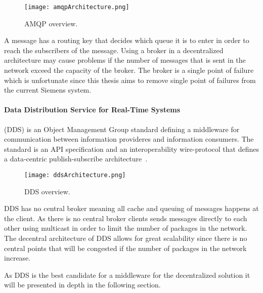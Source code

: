\begin{figure}[!h]
	\centering
	\texttt{[image: amqpArchitecture.png]} 
	\caption[JMS overview]{
		\label{fig:amqpOverview} 
		\footnotesize{%
			AMQP overview.
		}
	}
\end{figure}

A message has a routing key that decides which queue it is to enter in order to reach the subscribers of the message. Using a broker in a decentralized architecture may cause problems if the number of messages that is sent in the network exceed the capacity of the broker.
The broker is a single point of failure which is unfortunate since this thesis aims to remove single point of failures from the current Siemens system.

\paragraph{Data Distribution Service for Real-Time Systems} (DDS) is an Object Management Group standard defining a middleware for communication between information provideres and information consumers.
The standard is an API specification and an interoperability wire-protocol that defines a data-centric publish-subscribe architecture~\cite{pardo2003omg}.

\begin{figure}[!h]
	\centering
	\texttt{[image: ddsArchitecture.png]} 
	\caption[JMS overview]{
		\label{fig:ddsOverview} 
		\footnotesize{%
			DDS overview.
		}
	}
\end{figure}

DDS has no central broker meaning all cache and queuing of messages happens at the client. As there is no central broker clients sends messages directly to each other using multicast in order to limit the number of packages in the network. The decentral architecture of DDS allows for great scalability since there is no central points that will be congested if the number of packages in the network increase.

As DDS is the best candidate for a middleware for the decentralized solution it will be presented in depth in the following section.


